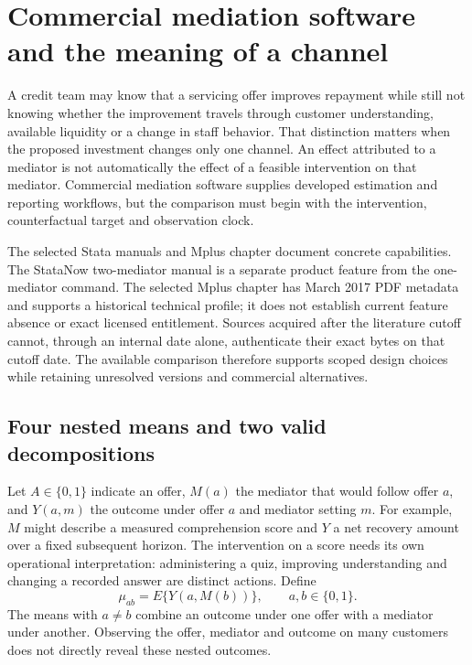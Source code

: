 \section{Commercial mediation software and the meaning of a channel}
\label{exec20:med-scope}
A credit team may know that a servicing offer improves repayment while still not knowing whether the improvement travels through customer understanding, available liquidity or a change in staff behavior. That distinction matters when the proposed investment changes only one channel. An effect attributed to a mediator is not automatically the effect of a feasible intervention on that mediator. Commercial mediation software supplies developed estimation and reporting workflows, but the comparison must begin with the intervention, counterfactual target and observation clock.

The selected Stata manuals and Mplus chapter document concrete capabilities. The StataNow two-mediator manual is a separate product feature from the one-mediator command. The selected Mplus chapter has March 2017 PDF metadata and supports a historical technical profile; it does not establish current feature absence or exact licensed entitlement. Sources acquired after the literature cutoff cannot, through an internal date alone, authenticate their exact bytes on that cutoff date. The available comparison therefore supports scoped design choices while retaining unresolved versions and commercial alternatives.~\citep{exec20_med_stata_one,exec20_med_stata_multiple,exec20_med_mplus_ch17}

\subsection{Four nested means and two valid decompositions}
\label{exec20:med-targets}
Let $A\in\{0,1\}$ indicate an offer, $M(a)$ the mediator that would follow offer $a$, and $Y(a,m)$ the outcome under offer $a$ and mediator setting $m$. For example, $M$ might describe a measured comprehension score and $Y$ a net recovery amount over a fixed subsequent horizon. The intervention on a score needs its own operational interpretation: administering a quiz, improving understanding and changing a recorded answer are distinct actions. Define
\begin{equation}
 \mu_{ab}=E\{Y(a,M(b))\},\qquad a,b\in\{0,1\}.
 \label{exec20:med-means}
\end{equation}
The means with $a\ne b$ combine an outcome under one offer with a mediator under another. Observing the offer, mediator and outcome on many customers does not directly reveal these nested outcomes.

